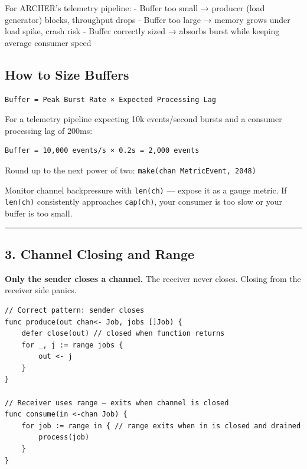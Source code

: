 \documentclass[11pt,a4paper,oneside]{book}
\begin{document}
For ARCHER's telemetry pipeline: - Buffer too small → producer (load
generator) blocks, throughput drops - Buffer too large → memory grows
under load spike, crash risk - Buffer correctly sized → absorbs burst
while keeping average consumer speed

\subsection{How to Size Buffers}

\begin{verbatim}
Buffer = Peak Burst Rate × Expected Processing Lag
\end{verbatim}

For a telemetry pipeline expecting 10k events/second bursts and a
consumer processing lag of 200ms:

\begin{verbatim}
Buffer = 10,000 events/s × 0.2s = 2,000 events
\end{verbatim}

Round up to the next power of two:
\texttt{make(chan\ MetricEvent,\ 2048)}

Monitor channel backpressure with \texttt{len(ch)} --- expose it as a
gauge metric. If \texttt{len(ch)} consistently approaches
\texttt{cap(ch)}, your consumer is too slow or your buffer is too small.

\begin{center}\rule{0.5\linewidth}{0.5pt}\end{center}

\subsection{3. Channel Closing and
Range}

\textbf{Only the sender closes a channel.} The receiver never closes.
Closing from the receiver side panics.

\begin{verbatim}
// Correct pattern: sender closes
func produce(out chan<- Job, jobs []Job) {
    defer close(out) // closed when function returns
    for _, j := range jobs {
        out <- j
    }
}

// Receiver uses range — exits when channel is closed
func consume(in <-chan Job) {
    for job := range in { // range exits when in is closed and drained
        process(job)
    }
}
\end{verbatim}
\end{document}
